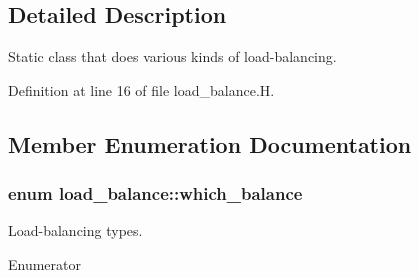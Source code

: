 \subsection{Detailed Description}
Static class that does various kinds of load-\/balancing. 

Definition at line 16 of file load\+\_\+balance.\+H.



\subsection{Member Enumeration Documentation}
\subsubsection[{\texorpdfstring{which\+\_\+balance}{which_balance}}]{\setlength{\rightskip}{0pt plus 5cm}enum {\bf load\+\_\+balance\+::which\+\_\+balance}}\hypertarget{classload__balance_aeda8ae1759629dfa65e6691678d0b3b9}{}\label{classload__balance_aeda8ae1759629dfa65e6691678d0b3b9}


Load-\/balancing types. 

\begin{Desc}
\item[Enumerator]\par
\begin{description}
\item[{\em 
knapsack\hypertarget{classload__balance_aeda8ae1759629dfa65e6691678d0b3b9a4aa96cf41f89612ecbeac1c49d1df0eb}{}\label{classload__balance_aeda8ae1759629dfa65e6691678d0b3b9a4aa96cf41f89612ecbeac1c49d1df0eb}
}]\item[{\em 
elliptic\hypertarget{classload__balance_aeda8ae1759629dfa65e6691678d0b3b9a7957e03542e3e768202452e40070034c}{}\label{classload__balance_aeda8ae1759629dfa65e6691678d0b3b9a7957e03542e3e768202452e40070034c}
}]\item[{\em 
multifluid\hypertarget{classload__balance_aeda8ae1759629dfa65e6691678d0b3b9a364252b3fa3eb865b807bce5e8c416f7}{}\label{classload__balance_aeda8ae1759629dfa65e6691678d0b3b9a364252b3fa3eb865b807bce5e8c416f7}
}]\end{description}
\end{Desc}


